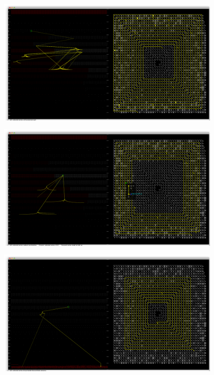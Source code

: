 \newpage
\begin{figure}[h!]
\centering
\includegraphics[scale=0.29, angle=90]{pictures/screenshot_4.png}
\end{figure}

\newpage
\begin{figure}[h!]
\centering
\includegraphics[scale=0.29, angle=90]{pictures/screenshot_5.png}
\end{figure}

\newpage
\begin{figure}[h!]
\centering
\includegraphics[scale=0.29, angle=90]{pictures/screenshot_6.png}
\end{figure}
